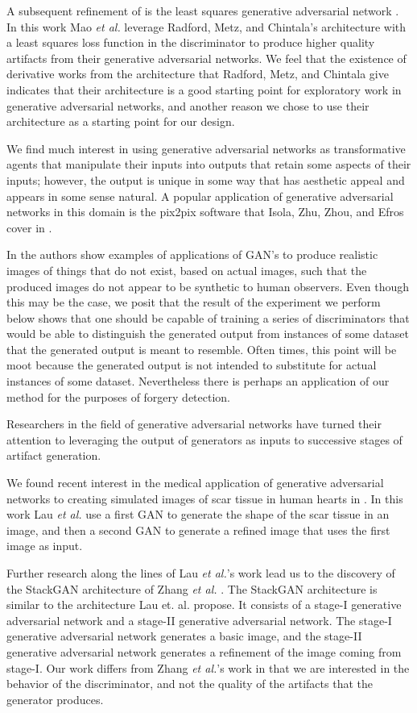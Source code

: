 \documentclass[conference]{IEEEtran}
\begin{document}
A subsequent refinement of \cite{repLearnDcgan} is the least squares generative
adversarial network \cite{lsgan}. In this work Mao \textit{et al.} leverage
Radford, Metz, and Chintala's architecture with a least squares loss function in 
the discriminator to produce higher quality artifacts from their generative
adversarial networks. We feel that the existence of derivative works from the 
architecture that Radford, Metz, and Chintala give indicates that their
architecture is a good starting point for exploratory work in generative
adversarial networks, and another reason we chose to use their architecture as
a starting point for our design.

We find much interest in using generative adversarial networks as transformative
agents that manipulate their inputs into outputs that retain some aspects of
their inputs; however, the output is unique in some way that has aesthetic
appeal and appears in some sense natural.  A popular application of generative
adversarial networks in this domain is the pix2pix software that Isola, Zhu,
Zhou, and Efros cover in \cite{pix2pix}.  

In \cite{pix2pix} the authors show examples of applications of GAN's to produce
realistic images of things that do not exist, based on actual images, such that
the produced images do not appear to be synthetic to human observers.  Even though 
this may be the case, we posit that the result of the experiment we perform
below shows that one should be capable of training a series of discriminators
that would be able to distinguish the generated output from instances of some
dataset that the generated output is meant to resemble.  Often times, this point
will be moot because the generated output is not intended to substitute for
actual instances of some dataset.  Nevertheless there is perhaps an application
of our method for the purposes of forgery detection.


Researchers in the field of generative adversarial networks have turned their
attention to leveraging the output of generators as inputs to successive stages
of artifact generation. 

We found recent interest in the medical application of generative adversarial 
networks to creating simulated images of scar tissue in human hearts in
\cite{scargan}.  In this work Lau \textit{et al.} use a first GAN to generate
the shape of the scar tissue in an image, and then a second GAN to generate a 
refined image that uses the first image as input.

Further research along the lines of Lau \textit{et al.}'s work lead us to the
discovery of the StackGAN architecture of Zhang \textit{et al.} \cite{stackgan}.
The StackGAN architecture is similar to the architecture Lau et. al. propose.  
It consists of a stage-I generative adversarial network and a stage-II
generative adversarial network.  The stage-I generative adversarial network 
generates a basic image, and the stage-II generative adversarial network
generates a refinement of the image coming from stage-I.  Our work differs from
Zhang \textit{et al.}'s work in that we are interested in the behavior of the
discriminator, and not the quality of the artifacts that the generator produces.
\end{document}
